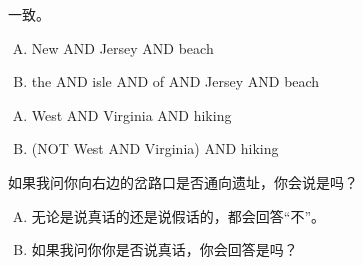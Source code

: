{{\begin{practices}
            一致。
        \end{practices}

        \begin{practices}
            \begin{enumerate}[A.]
                \item New AND Jersey AND beach
                \item the AND isle AND of AND Jersey AND beach
            \end{enumerate}
        \end{practices}

        \begin{practices}
            \begin{enumerate}[A.]
                \item West AND Virginia AND hiking
                \item (NOT West AND Virginia) AND hiking
            \end{enumerate}
        \end{practices}

        \begin{practices}
            如果我问你向右边的岔路口是否通向遗址，你会说是吗？
        \end{practices}

        \begin{practices}
            \begin{enumerate}[A.]
                \item 无论是说真话的还是说假话的，都会回答``不''。
                \item 如果我问你你是否说真话，你会回答是吗？
            \end{enumerate}
        \end{practices}
    }
}
